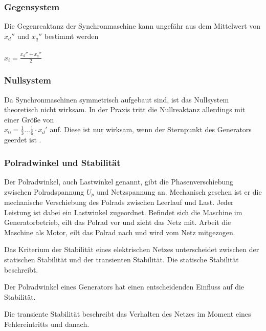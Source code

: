 \documentclass{scrartcl}
\begin{document}
\begin{onehalfspace}
\subsubsection{Gegensystem}
Die Gegenreaktanz der Synchronmaschine kann ungefähr aus dem Mittelwert von $x_d''$ und $x_q''$ bestimmt werden \cite[S. 165]{Funk1962} \\ \\
$x_i = \frac{x_d'' + x_q''}{2}$

\subsubsection{Nullsystem}
Da Synchronmaschinen symmetrisch aufgebaut sind, ist das Nullsystem theoretisch nicht wirksam. In der Praxis tritt die Nullreaktanz allerdings mit einer Größe von \\
$x_0 = \frac{1}{3} … \frac{1}{6} \cdot x_d'$ auf. Diese ist nur wirksam, wenn der Sternpunkt des Generators geerdet ist \cite[S. 166]{Funk1962}.

\subsubsection{Polradwinkel und Stabilität}
Der Polradwinkel, auch Lastwinkel genannt, gibt die Phasenverschiebung zwischen Polradspannung $U_p$ und Netzspannung an. Mechanisch gesehen ist er die mechanische Verschiebung des Polrads zwischen Leerlauf und Last. Jeder Leistung ist dabei ein Lastwinkel zugeordnet. Befindet sich die Maschine im Generatorbetrieb, eilt das Polrad vor und \glqq zieht\grqq{} das Netz mit. Arbeit die Maschine als Motor, eilt das Polrad nach und wird vom Netz \glqq mitgezogen\grqq \cite[S. 187]{Heuck2007}.

Das Kriterium der Stabilität eines elektrischen Netzes unterscheidet zwischen der statischen Stabilität und der transienten Stabilität. Die statische Stabilität beschreibt.

Der Polradwinkel eines Generators hat einen entscheidenden Einfluss auf die Stabilität.

Die transiente Stabilität beschreibt das Verhalten des Netzes im Moment eines Fehlereintritts und danach.


\end{onehalfspace}
\end{document}
